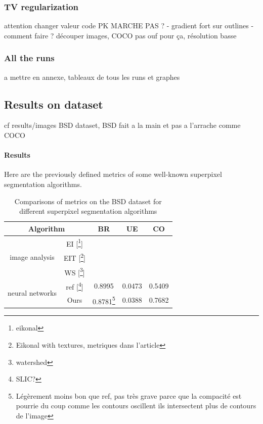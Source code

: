 \documentclass{article}
\begin{document}
        \subsubsection{TV regularization}
            attention changer valeur code
            PK MARCHE PAS ?
            - gradient fort sur outlines
            - comment faire ? découper images, COCO pas ouf pour ça, résolution basse
        \subsubsection{All the runs}
            a mettre en annexe, tableaux de tous les runs et graphes

    \subsection{Results on dataset}
    cf results/images
    BSD dataset, BSD fait a la main et pas a l'arrache comme COCO

        \paragraph{Results}
        Here are the previously defined metrics of some well-known superpixel segmentation algorithms.
        \begin{table}[!ht]
            \centering
            \begin{tabular}{|c|c|ccc|}
                \hline
                \multicolumn{2}{|c|}{Algorithm} & BR & UE & CO\\
                \hline
                \hline
                \multirow{3}{*}{image analysis} & EI [\footnote{eikonal}] & & & \\
                & EIT [\footnote{Eikonal with textures, metriques dans l'article}] & & & \\
                & WS [\footnote{watershed}] & & & \\
                \hline
                \multirow{2}{*}{neural networks} & ref [\footnote{SLIC?}] & 0.8995 & 0.0473 & 0.5409\\
                & Ours & 0.8781\footnote{Légèrement moins bon que ref, pas très grave parce que la compacité est pourrie du coup comme les contours oscillent ils intersectent plus de contours de l'image} & 0.0388 & 0.7682\\
                \hline
            \end{tabular}
            \caption{Comparisons of metrics on the BSD dataset for different
            superpixel segmentation algorithms}
        \end{table}
\end{document}
